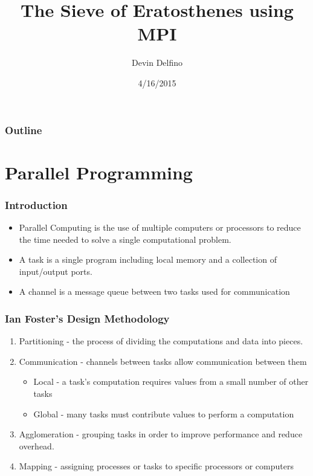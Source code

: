 \documentclass[13pt]{beamer}
\title{The Sieve of Eratosthenes using MPI}
\author{Devin Delfino}
\institute{Comp 401: Senior Seminar}
\date{4/16/2015}
\begin{document}
\frame{\titlepage}


\begin{frame}
\frametitle{Outline}
\tableofcontents
\end{frame}

\section{Parallel Programming} %
\begin{frame}
\frametitle{Introduction}

\begin{itemize}
  \item \alert{Parallel Computing} is the use of multiple computers or processors to reduce the time needed to solve a single computational problem.
  \item A \alert{task} is a single program including local memory and a collection of input/output ports.
  \item A \alert{channel} is a message queue between two tasks used for communication
\end{itemize}
\end{frame}

\begin{frame}
\frametitle{Ian Foster's Design Methodology}
  \begin{enumerate}
    \item \alert{Partitioning} - the process of dividing the computations and data into pieces.
    \item \alert{Communication} - channels between tasks allow communication between them
          \begin{itemize}
            \item Local - a task's computation requires values from a small number of other tasks
            \item Global - many tasks must contribute values to perform a computation
          \end{itemize}
    \item \alert{Agglomeration} - grouping tasks in order to improve performance and reduce overhead.
    \item \alert{Mapping} - assigning processes or tasks to specific processors or computers
  \end{enumerate}
\end{frame}
\end{document}
